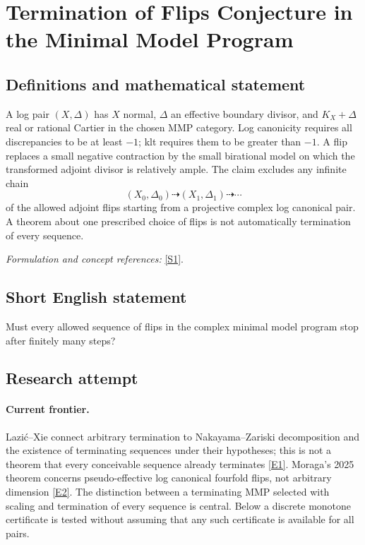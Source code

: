 \documentclass[11pt,a4paper]{article}
\numberwithin{equation}{section}
\newcommand{\sref}[2]{\hyperlink{source:#1:#2}{[S#2]}}
\newcommand{\eref}[2]{\hyperlink{extra:#1:#2}{[E#2]}}
\newif\ifshowcatalogue
\newcommand{\cataloguescope}[1]{\ifshowcatalogue
 \paragraph{Exact scope in the supplied catalogue.}
 \begin{quote}\small #1\end{quote}\fi}
\begin{document}
\setcounter{section}{0}
\section*{\texorpdfstring{Termination of Flips Conjecture in the Minimal Model Program}{Termination of Flips Conjecture in the Minimal Model Program}}\label{statement}
\subsection{Definitions and mathematical statement}
A log pair $(X,\Delta)$ has $X$ normal, $\Delta$ an effective boundary divisor, and $K_X+\Delta$ real or rational Cartier in the chosen MMP category. Log canonicity requires all discrepancies to be at least $-1$; klt requires them to be greater than $-1$. A flip replaces a small negative contraction by the small birational model on which the transformed adjoint divisor is relatively ample. The claim excludes any infinite chain
\[
 (X_0,\Delta_0)\dashrightarrow(X_1,\Delta_1)\dashrightarrow\cdots
\]
of the allowed adjoint flips starting from a projective complex log canonical pair. A theorem about one prescribed choice of flips is not automatically termination of every sequence.
\par\smallskip\textit{Formulation and concept references:} \sref{statement}{1}.
\cataloguescope{Prove that there is no infinite sequence of flips in the minimal model program: for a projective log canonical (or klt) pair over the complex numbers, every sequence of (K\_X + Delta)-flips terminates after finitely many steps, in every dimension.}
\subsection{Short English statement}
Must every allowed sequence of flips in the complex minimal model program stop after finitely many steps?
\subsection{Research attempt}

\paragraph{Current frontier.}
Lazi\'c--Xie connect arbitrary termination to Nakayama--Zariski decomposition
and the existence of terminating sequences under their hypotheses; this
is not a theorem that every conceivable sequence already terminates
\eref{statement}{1}. Moraga's 2025 theorem concerns pseudo-effective log canonical
fourfold flips, not arbitrary dimension \eref{statement}{2}.
The distinction between a terminating MMP selected with scaling and
termination of every sequence is central. Below a discrete monotone
certificate is tested without assuming that any such certificate is
available for all pairs.
\end{document}
